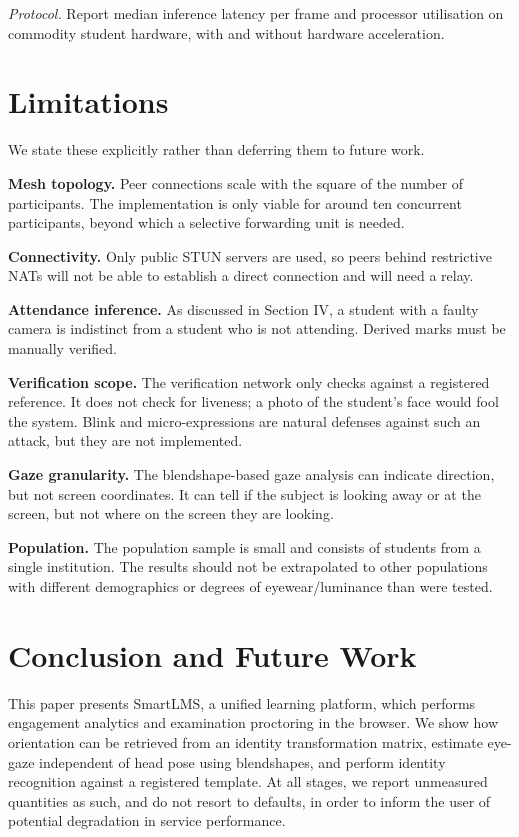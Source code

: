 \documentclass[conference]{IEEEtran}
\begin{document}
\textit{Protocol.} Report median inference latency per frame and processor
utilisation on commodity student hardware, with and without hardware
acceleration.

\section{Limitations}
\label{sec:limitations}

We state these explicitly rather than deferring them to future work.

\textbf{Mesh topology.} Peer connections scale with the square of
the number of participants. The implementation is only viable for
around ten concurrent participants, beyond which a selective forwarding
unit is needed.

\textbf{Connectivity.} Only public STUN servers are used, so peers behind
restrictive NATs will not be able to establish a direct connection and
will need a relay.

\textbf{Attendance inference.} As discussed in Section IV, a student
with a faulty camera is indistinct from a student who is not attending.
Derived marks must be manually verified.

\textbf{Verification scope.} The verification network only checks against a
registered reference. It does not check for liveness; a photo of the
student's face would fool the system. Blink and micro-expressions are
natural defenses against such an attack, but they are not implemented.

\textbf{Gaze granularity.} The blendshape-based gaze analysis can indicate
direction, but not screen coordinates. It can tell if the subject is
looking away or at the screen, but not where on the screen they are
looking.

\textbf{Population.} The population sample is small and consists of
students from a single institution. The results should not be
extrapolated to other populations with different demographics or
degrees of eyewear/luminance than were tested.

\section{Conclusion and Future Work}

This paper presents SmartLMS, a unified learning platform, which performs
engagement analytics and examination proctoring in the browser. We
show how orientation can be retrieved from an identity transformation
matrix, estimate eye-gaze independent of head pose using blendshapes,
and perform identity recognition against a registered template. At all
stages, we report unmeasured quantities as such, and do not resort to
defaults, in order to inform the user of potential degradation in service
performance.
\end{document}
